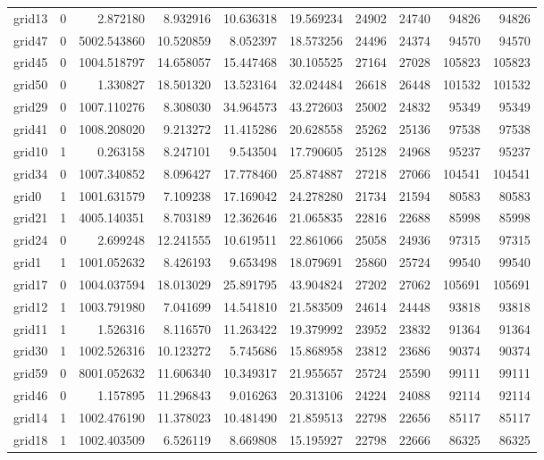 \begin{longtable}{|l|r|r|r|r|r|r|r|r|r|}
grid13 & 0 & 2.872180 & 8.932916 & 10.636318 & 19.569234 & 24902 & 24740 & 94826 & 94826 \\
grid47 & 0 & 5002.543860 & 10.520859 & 8.052397 & 18.573256 & 24496 & 24374 & 94570 & 94570 \\
grid45 & 0 & 1004.518797 & 14.658057 & 15.447468 & 30.105525 & 27164 & 27028 & 105823 & 105823 \\
grid50 & 0 & 1.330827 & 18.501320 & 13.523164 & 32.024484 & 26618 & 26448 & 101532 & 101532 \\
grid29 & 0 & 1007.110276 & 8.308030 & 34.964573 & 43.272603 & 25002 & 24832 & 95349 & 95349 \\
grid41 & 0 & 1008.208020 & 9.213272 & 11.415286 & 20.628558 & 25262 & 25136 & 97538 & 97538 \\
grid10 & 1 & 0.263158 & 8.247101 & 9.543504 & 17.790605 & 25128 & 24968 & 95237 & 95237 \\
grid34 & 0 & 1007.340852 & 8.096427 & 17.778460 & 25.874887 & 27218 & 27066 & 104541 & 104541 \\
grid0 & 1 & 1001.631579 & 7.109238 & 17.169042 & 24.278280 & 21734 & 21594 & 80583 & 80583 \\
grid21 & 1 & 4005.140351 & 8.703189 & 12.362646 & 21.065835 & 22816 & 22688 & 85998 & 85998 \\
grid24 & 0 & 2.699248 & 12.241555 & 10.619511 & 22.861066 & 25058 & 24936 & 97315 & 97315 \\
grid1 & 1 & 1001.052632 & 8.426193 & 9.653498 & 18.079691 & 25860 & 25724 & 99540 & 99540 \\
grid17 & 0 & 1004.037594 & 18.013029 & 25.891795 & 43.904824 & 27202 & 27062 & 105691 & 105691 \\
grid12 & 1 & 1003.791980 & 7.041699 & 14.541810 & 21.583509 & 24614 & 24448 & 93818 & 93818 \\
grid11 & 1 & 1.526316 & 8.116570 & 11.263422 & 19.379992 & 23952 & 23832 & 91364 & 91364 \\
grid30 & 1 & 1002.526316 & 10.123272 & 5.745686 & 15.868958 & 23812 & 23686 & 90374 & 90374 \\
grid59 & 0 & 8001.052632 & 11.606340 & 10.349317 & 21.955657 & 25724 & 25590 & 99111 & 99111 \\
grid46 & 0 & 1.157895 & 11.296843 & 9.016263 & 20.313106 & 24224 & 24088 & 92114 & 92114 \\
grid14 & 1 & 1002.476190 & 11.378023 & 10.481490 & 21.859513 & 22798 & 22656 & 85117 & 85117 \\
grid18 & 1 & 1002.403509 & 6.526119 & 8.669808 & 15.195927 & 22798 & 22666 & 86325 & 86325 \\

\end{longtable}
